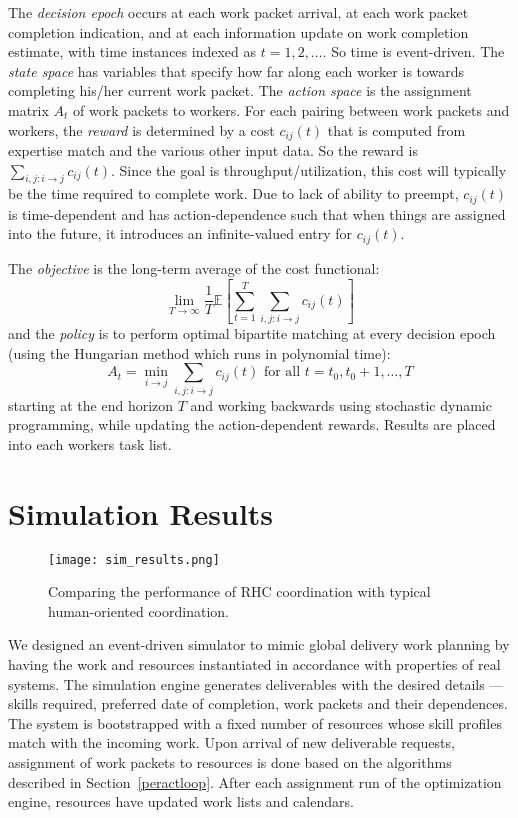\documentclass[10pt,journal,cspaper,compsoc]{IEEEtran}
\begin{document}
The \emph{decision epoch} occurs at each work packet arrival, at each work packet completion 
indication, and at each information update on work completion estimate, with time instances indexed 
as $t=1,2,\ldots$. So time is event-driven.  The \emph{state space} has variables that specify 
how far along each worker is towards completing his/her current work packet.  The \emph{action space}
is the assignment matrix $A_t$ of work packets to workers.  For each pairing between work packets and workers, 
the \emph{reward} is determined by a cost $c_{ij}(t)$ that is computed from expertise match and the various 
other input data.  So the reward is $\sum_{i,j: i \rightarrow j} c_{ij}(t)$.  Since the goal is 
throughput/utilization, this cost will typically be the time required to complete work.  Due to lack of 
ability to preempt, $c_{ij}(t)$ is time-dependent and has action-dependence such that when things are assigned 
into the future, it introduces an infinite-valued entry for $c_{ij}(t)$.

The \emph{objective} is the long-term average of the cost functional:
\[
\lim_{T\rightarrow \infty} \frac{1}{T} \mathbb{E}\left[ \sum_{t=1}^T \sum_{i,j: i \rightarrow j} c_{ij}(t) \right]
\]
and the \emph{policy} is to perform optimal bipartite matching at every decision epoch (using the Hungarian method which runs 
in polynomial time): 
\[
A_t = \min_{i\rightarrow j} \sum_{i,j: i \rightarrow j} c_{ij}(t) \mbox{ for all } t = t_0, t_0 + 1, \ldots, T
\]
starting at the end horizon $T$ and working backwards using stochastic dynamic programming, while updating the action-dependent rewards.  
Results are placed into each workers task list.  

\section{Simulation Results}
\label{sec:simul}
\begin{figure*}
  \centering
  \texttt{[image: sim\_results.png]}
  \caption{Comparing the performance of RHC coordination with typical human-oriented coordination.}
  \label{fig:results}
\end{figure*}
We designed an event-driven simulator to mimic global delivery work planning by having 
the work and resources instantiated in accordance with properties of real systems. The 
simulation engine generates deliverables with the desired details --– skills required, preferred 
date of completion, work packets and their dependences. The system is bootstrapped with a 
fixed number of resources whose skill profiles match with the incoming work. Upon arrival of 
new deliverable requests, assignment of work packets to resources is done based on the algorithms
described in Section~\ref{peractloop}.  After each assignment run of the optimization engine, 
resources have updated work lists and calendars.  
\end{document}
